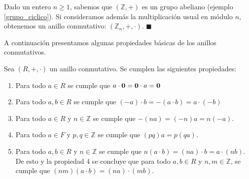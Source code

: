 \begin{example}
Dado un entero $n \geq 1$, sabemos que $(\mathbb{Z}, +)$ es un grupo abeliano (ejemplo \ref{grupo_ciclico}). Si consideramos además la multiplicación usual en módulo $n$, obtenemos un anillo conmutativo: $(\mathbb{Z}_n, +, \cdot)$. \hfill$\blacksquare$
\end{example}

A continuación presentamos algunas propiedades básicas de los anillos conmutativos.

\begin{proposition}\label{propiedades_anillos}
    Sea $(R, +, \cdot)$ un anillo conmutativo. Se cumplen las siguientes propiedades:
    \begin{enumerate}
    \item Para todo $a\in R$ se cumple que $a\cdot \mathbf{0} =\mathbf{0}\cdot a= \mathbf{0}$
    
    \item Para todo $a,b\in R$ se cumple que $(-a)\cdot b=-(a\cdot b) = a\cdot (-b)$
    
    \item Para todo $a \in R$ y $n \in \mathbb{Z}$ se cumple que $-(na) = (-n)a = n(-a)$.
    
    \item Para todo $a \in F$ y $p,q \in \mathbb{Z}$ se cumple que $(pq)a = p(qa)$.
    
    \item Para todo $a,b\in R$ y $n \in \mathbb{Z}$ se cumple que $n(a\cdot b) = (na)\cdot b = a \cdot (nb)$. De esto y la propiedad 4 se concluye que para todo $a,b\in R$ y $n,m \in \mathbb{Z}$, se cumple que $(nm)(a\cdot b) = (na)\cdot (mb)$.   
    \end{enumerate}
    \end{proposition}
    
